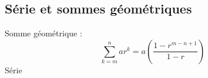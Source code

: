 \documentclass[10pt, french]{article}
\begin{document}
\begin{multicols*}{3} %
\section{Série et sommes géométriques}
Somme géométrique : 
\[\sum_{k=m}^{n} a r^{k} = a \left( \frac{1 - r^{m-n+1}}{1-r} \right)  \]
Série





\end{multicols*}
\end{document}
